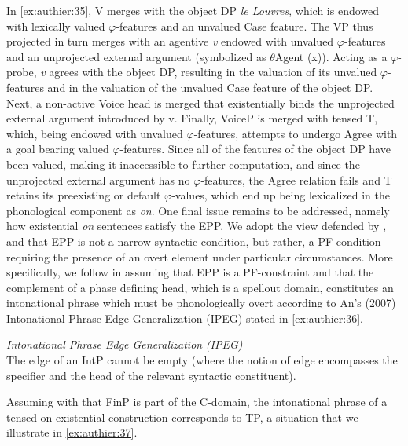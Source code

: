 \documentclass[output=paper,colorlinks,citecolor=brown]{langscibook}
\begin{document}
In \ref{ex:authier:35}, V merges with the object DP \textit{le Louvres}, which is endowed with lexically valued ${\varphi}${}-features and an unvalued Case feature. The VP thus projected in turn merges with an agentive \textit{v} endowed with unvalued ${\varphi}${}-features and an unprojected external argument (symbolized as ${\theta}$Agent (x)). Acting as a ${\varphi}${}-probe, \textit{v} agrees with the object DP, resulting in the valuation of its unvalued ${\varphi}${}-features and in the valuation of the unvalued Case feature of the object DP. Next, a non-active Voice head is merged that existentially binds the unprojected external argument introduced by v. Finally, VoiceP is merged with tensed T, which, being endowed with unvalued ${\varphi}${}-features, attempts to undergo Agree with a goal bearing valued ${\varphi}${}-features. Since all of the features of the object DP have been valued, making it inaccessible to further computation, and since the unprojected external argument has no ${\varphi}${}-features, the Agree relation fails and T retains its preexisting or default ${\varphi}${}-values, which end up being lexicalized in the phonological component as \textit{on}. 
One final issue remains to be addressed, namely how existential \textit{on} sentences satisfy the EPP. We adopt the view defended by \citet{holmberg2000a}, \citet{merchant2001a} and \citet{landau2007a} that EPP is not a narrow syntactic condition, but rather, a PF condition requiring the presence of an overt element under particular circumstances. More specifically, we follow \citet{mcfadden2018a} in assuming that EPP is a PF-constraint and that the complement of a phase defining head, which is a spellout domain, constitutes an intonational phrase which must be phonologically overt according to An’s (2007) Intonational Phrase Edge Generalization (IPEG) stated in \ref{ex:authier:36}.


\begin{exe}
\ex\label{ex:authier:36} 
 \textit{Intonational Phrase Edge Generalization} \textit{(IPEG)}\\
 The edge of an IntP cannot be empty (where the notion of edge encompasses the specifier and the head of the relevant syntactic constituent).\\
\citep[61]{an2007a}
\end{exe}


Assuming with \citet{haegeman2017a} that FinP is part of the C-domain, the intonational phrase of a tensed on existential construction corresponds to TP, a situation that we illustrate in \ref{ex:authier:37}.
\end{document}
